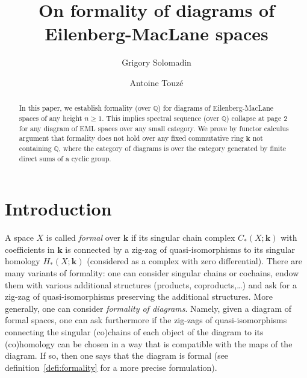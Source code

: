 \documentclass{amsart}
\theoremstyle{definition}
\theoremstyle{remark}
\newcommand{\Q}{\mathbb Q}
\renewcommand{\geq}{\geqslant}
\def\k{\mathbf{k}}
\begin{document}
	
	\title[On formality of diagrams of Eilenberg-MacLane spaces]{On formality of diagrams of Eilenberg-MacLane spaces}
	
	\author{Grigory Solomadin}
	\address[G.\,Solomadin]{PU Marburg, Marburg, Germany}
	
	\author{Antoine Touz\'e}
	\address[A.\,Touz\'e]{Univ. Lille, CNRS, UMR 8524 - Laboratoire Paul Painlevé, F-59000 Lille, France}
	
	
	\begin{abstract}
		In this paper, we establish formality (over $\Q$) for diagrams of Eilenberg-MacLane spaces of any height $n\geq 1$.
		This implies spectral sequence (over $\Q$) collapse at page $2$ for any diagram of EML spaces over any small category.
		We prove by functor calculus argument that formality does not hold over any fixed commutative ring $\k$ not containing $\Q$, where the category of diagrams is over the category generated by finite direct sums of a cyclic group.
	\end{abstract}
		
	\maketitle
	

\section{Introduction}

A space $X$ is called \emph{formal} over $\k$ if its singular chain complex $C_{*}(X;\k)$ with coefficients in $\k$ is connected by a zig-zag of quasi-isomorphisms to its singular homology $H_{*}(X;\k)$ (considered as a complex with zero differential). 
There are many variants of formality: one can consider singular chains or cochains, endow them with various additional structures (products, coproducts,\dots) and ask for a zig-zag of quasi-isomorphisms preserving the additional structures. 
More generally, one can consider \emph{formality of diagrams}. Namely, given a diagram of formal spaces, one can ask furthermore if the zig-zags of quasi-isomorphisms connecting the singular (co)chains of each object of the diagram to its (co)homology can be chosen in a way that is compatible with the maps of the diagram. If so, then one says that the diagram is formal (see definition~\ref{defi:formality} for a more precise formulation).
\end{document}
